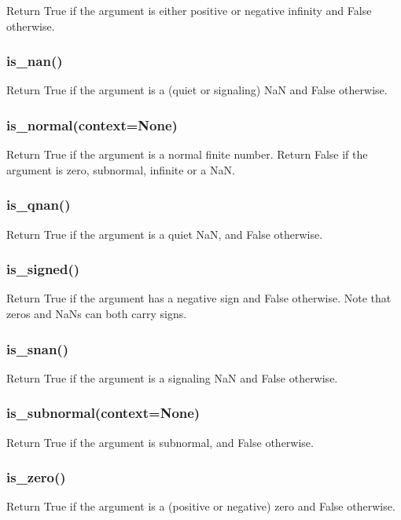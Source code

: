 Return True if the argument is either positive or negative infinity and False otherwise.

\subsubsection{is\_nan()}

Return True if the argument is a (quiet or signaling) NaN and False otherwise.

\subsubsection{is\_normal(context=None)}

Return True if the argument is a normal finite number. Return False if the argument is zero, subnormal, infinite or a NaN.

\subsubsection{is\_qnan()}

Return True if the argument is a quiet NaN, and False otherwise.

\subsubsection{is\_signed()}

Return True if the argument has a negative sign and False otherwise. Note that zeros and NaNs can both carry signs.

\subsubsection{is\_snan()}

Return True if the argument is a signaling NaN and False otherwise.

\subsubsection{is\_subnormal(context=None)}

Return True if the argument is subnormal, and False otherwise.

\subsubsection{is\_zero()}

Return True if the argument is a (positive or negative) zero and False otherwise.


